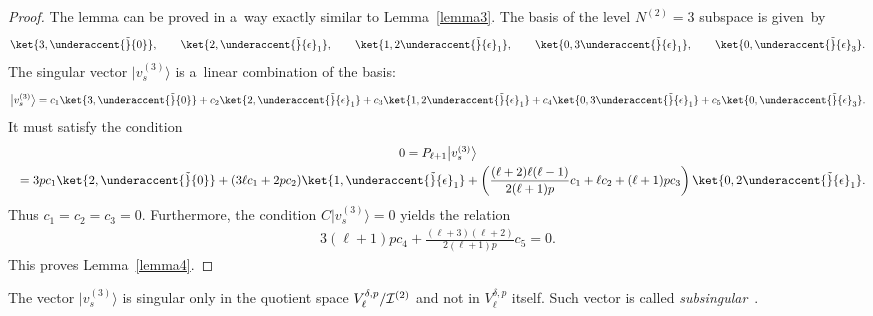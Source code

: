 \documentclass[pdftex]{sigma}
\numberwithin{equation}{section}
\begin{document}
\begin{proof}
The lemma can be proved in a~way exactly similar to Lemma~\ref{lemma3}.
The basis of the level $ N^{(2)} = 3 $ subspace is given~by
\begin{gather*}
\ket{3,\underaccent{\tilde}{0}},
\qquad
\ket{2,\underaccent{\tilde}{\epsilon}_1},
\qquad
\ket{1,2\underaccent{\tilde}{\epsilon}_1},
\qquad
\ket{0,3\underaccent{\tilde}{\epsilon}_1},
\qquad
\ket{0,\underaccent{\tilde}{\epsilon}_3}.
\end{gather*}
The singular vector $ \big|v_s^{(3)}\big\rangle  $ is a~linear combination of the basis:
\begin{gather*}
\big|v_s^{(3)}\big\rangle  = c_1 \ket{3,\underaccent{\tilde}{0}} + c_2 \ket{2,\underaccent{\tilde}{\epsilon}_1} + c_3
\ket{1,2\underaccent{\tilde}{\epsilon}_1} + c_4 \ket{0,3\underaccent{\tilde}{\epsilon}_1} + c_5
\ket{0,\underaccent{\tilde}{\epsilon}_3}.
\end{gather*}
It must satisfy the condition
\begin{gather*}
0  =  P_{\ell+1} \big|v_s^{(3)}\big\rangle
\\
\hphantom{0}{}
 =  3 p c_1 \ket{2,\underaccent{\tilde}{0}} + (3\ell c_1 + 2p c_2) \ket{1,\underaccent{\tilde}{\epsilon}_1} +
\left(\frac{(\ell+2) \ell (\ell-1)}{2(\ell+1)p} c_1 + \ell c_2 + (\ell+1) p c_3 \right) \ket{0,
2\underaccent{\tilde}{\epsilon}_1}.
\end{gather*}
Thus $ c_1 = c_2 = c_3 = 0$.
Furthermore, the condition $ C \big|v_s^{(3)}\big\rangle  = 0 $ yields the relation
\begin{gather*}
3 (\ell+1) p c_4 + \frac{(\ell+3) (\ell+2)}{2(\ell+1)p} c_5 = 0.
\end{gather*}
This proves  Lemma~\ref{lemma4}.
\end{proof}

The vector $ \big|v_s^{(3)}\big\rangle  $ is singular only in the quotient space $ V^{\delta,p}_{\ell}/{\cal I}^{(2)} $ and not in
$ V^{\delta,p}_{\ell} $ itself.
Such vector is called \textit{subsingular}~\cite{Dob95,Dob97}.
\end{document}
